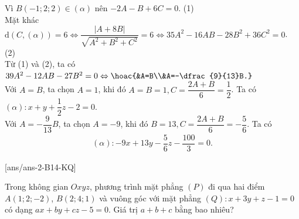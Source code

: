 \begin{ex}
{\begin{itemchoice}
Vì $B(-1;2;2)\in (\alpha)$ nên $-2A-B+6C=0$. (1)\\
Mặt khác $\mathrm{d}\left(C,(\alpha)\right)=6\Leftrightarrow \dfrac{\left|A+8B\right|}{\sqrt{A^2+B^2+C^2}}=6\Leftrightarrow 35A^2-16AB-28B^2+36C^2=0$. (2)\\
Từ (1) và (2), ta có
$39A^2-12AB-27B^2=0\Leftrightarrow \hoac{&A=B\\&A=-\dfrac{9}{13}B.}$\\
Với $A=B$, ta chọn $A=1$, khi đó $A=B=1,C=\dfrac{2A+B}{6}=\dfrac{1}{2}$. Ta có
$(\alpha)\colon x+y+\dfrac{1}{2}z-2=0.$\\
Với $A=-\dfrac{9}{13}B$, ta chọn $A=-9$, khi đó $B=13,C=\dfrac{2A+B}{6}=-\dfrac{5}{6}$. Ta có
\begin{eqnarray*}
(\alpha)\colon -9x+13y-\dfrac{5}{6}z-\dfrac{100}{3}=0.
\end{eqnarray*}
\end{itemchoice}
}
\end{ex}

[ans/ans-2-B14-KQ]
\caukq

\begin{ex}%
Trong không gian $Oxyz$, phương trình mặt phẳng $(P)$ đi qua hai điểm $A(1;2;-2)$, $B(2;4;1)$ và vuông góc với mặt phẳng $(Q)\colon x+3y+z-1=0$ có dạng $ax+by+cz-5=0$. Giá trị $a+b+c$ bằng bao nhiêu?
\end{ex}

